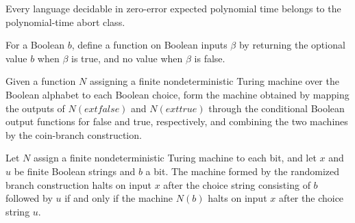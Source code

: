 \begin{theorem}
\label{Randomized.ZPP_PTM_subset_ZPPAbort_PTM}
\leanok
{}
Every language decidable in zero-error expected polynomial time belongs to the
polynomial-time abort class.
\end{theorem}

\begin{definition}
\label{Randomized.keepAs}
\leanok
For a Boolean $b$, define a function on Boolean inputs $\beta$ by returning the optional
value $b$ when $\beta$ is true, and no value when $\beta$ is false.
\end{definition}

\begin{definition}
\label{Randomized.zppAttempt}
\leanok
{}
Given a function $N$ assigning a finite nondeterministic Turing machine over the Boolean
alphabet to each Boolean choice, form the machine obtained by mapping the outputs of
$N(	ext{false})$ and $N(	ext{true})$ through the conditional Boolean output functions
for false and true, respectively, and combining the two machines by the coin-branch
construction.
\end{definition}

\begin{theorem}
\label{Randomized.zppAttempt_halted}
\leanok
{}
Let $N$ assign a finite nondeterministic Turing machine to each bit, and let $x$ and $u$
be finite Boolean strings and $b$ a bit. The machine formed by the randomized branch
construction halts on input $x$ after the choice string consisting of $b$ followed by
$u$ if and only if the machine $N(b)$ halts on input $x$ after the choice string $u$.
\end{theorem}

